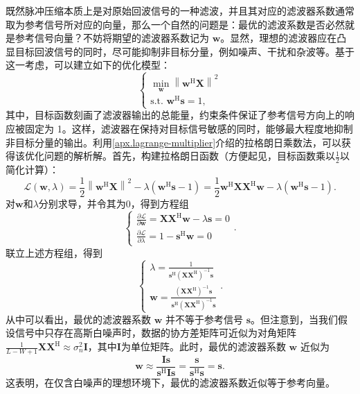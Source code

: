 既然脉冲压缩本质上是对原始回波信号的一种滤波，并且其对应的滤波器系数通常取为参考信号所对应的向量，那么一个自然的问题是：最优的滤波系数是否必然就是参考信号向量？不妨将期望的滤波器系数记为 \( \bm{w} \)。显然，理想的滤波器应在凸显目标回波信号的同时，尽可能抑制非目标分量，例如噪声、干扰和杂波等。基于这一考虑，可以建立如下的优化模型：
\[
    \begin{cases}
        \min\limits_{\bm{w}} \left\| \bm{w}^{\mathrm{H}} \mathbf{X} \right\|^2 \\[6pt]
        \text{s.t. } \bm{w}^{\mathrm{H}} \bm{s} = 1 ,
    \end{cases}
\]
其中，目标函数刻画了滤波器输出的总能量，约束条件保证了参考信号方向上的响应被固定为 1。这样，滤波器在保持对目标信号敏感的同时，能够最大程度地抑制非目标分量的输出。利用\cref{apx.lagrange-multiplier}介绍的拉格朗日乘数法，可以获得该优化问题的解析解。首先，构建拉格朗日函数（方便起见，目标函数乘以\( \frac{1}{2} \)以简化计算）：
\[
    \mathcal{L}(\bm{w}, \lambda) = \frac{1}{2}\left\| \bm{w}^{\mathrm{H}} \mathbf{X} \right\|^2 - \lambda \left( \bm{w}^{\mathrm{H}} \bm{s} - 1 \right) = \frac{1}{2} \bm{w}^{\mathrm{H}} \mathbf{X} \mathbf{X}^{\mathrm{H}} \bm{w} - \lambda \left( \bm{w}^{\mathrm{H}} \bm{s} - 1 \right).
\]
对\( \bm{w} \)和\( \lambda \)分别求导，并令其为0，得到方程组
\[
    \begin{cases}
        \frac{\partial \mathcal{L}}{\partial \bm{w}} = \mathbf{X} \mathbf{X}^{\mathrm{H}} \bm{w} - \lambda \bm{s} = 0 \\
        \frac{\partial \mathcal{L}}{\partial \lambda} = 1 - \bm{s}^{\mathrm{H}} \bm{w} = 0
    \end{cases}.
\]
联立上述方程组，得到
\[
    \begin{cases}
        \lambda = \frac{1}{\bm{s}^{\mathrm{H}} (\mathbf{X} \mathbf{X}^{\mathrm{H}})^{-1} \bm{s}} \\
        \bm{w} = \frac{(\mathbf{X} \mathbf{X}^{\mathrm{H}})^{-1} \bm{s}}{\bm{s}^{\mathrm{H}} (\mathbf{X} \mathbf{X}^{\mathrm{H}})^{-1} \bm{s}}
    \end{cases}.
\]
从中可以看出，最优的滤波器系数 \( \bm{w} \) 并不等于参考信号 \( \bm{s} \)。但注意到，当我们假设信号中只存在高斯白噪声时，数据的协方差矩阵可近似为对角矩阵\( \frac{1}{L-W+1} \mathbf{X} \mathbf{X}^{\mathrm{H}} \approx \sigma^2_n \mathbf{I} \)，其中\( \mathbf{I} \)为单位矩阵。此时，最优的滤波器系数 \( \bm{w} \) 近似为
\[
    \bm{w} \approx \frac{ \mathbf{I} \bm{s}}{\bm{s}^{\mathrm{H}} \mathbf{I} \bm{s}} = \frac{\bm{s}}{\bm{s}^{\mathrm{H}} \bm{s}} = \bm{s}.
\]
这表明，在仅含白噪声的理想环境下，最优的滤波器系数近似等于参考向量。

